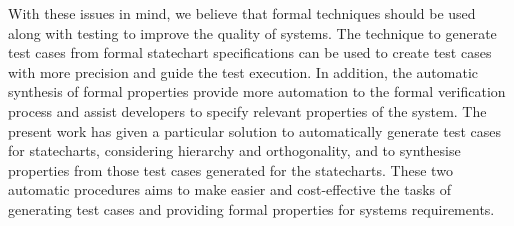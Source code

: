 With these issues in mind, we believe that formal techniques should be used along with testing to improve the quality of systems. The technique to generate test cases from formal statechart specifications can be used to create test cases with more precision and guide the test execution. In addition, the automatic synthesis of formal properties provide more automation to the formal verification process and assist developers to specify relevant properties of the system. The present work has given a particular solution to automatically generate test cases for statecharts, considering hierarchy and orthogonality, and to synthesise properties from those test cases generated for the statecharts. These two automatic procedures aims to make easier and cost-effective the tasks of generating test cases and providing formal properties for systems requirements.
